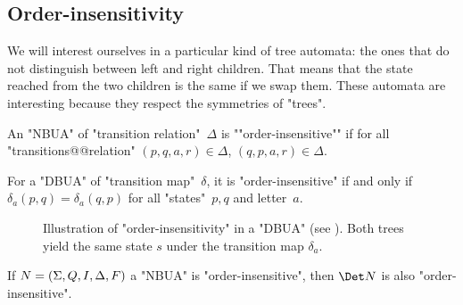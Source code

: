 \documentclass[a4paper,UKenglish,cleveref, autoref, thm-restate]{lipics-v2021}
\begin{document}
\subsection{Order-insensitivity}\label{sec:OrderAutomata}

We will interest ourselves in a particular kind of tree automata: the ones that do not distinguish between left and right children.
That means that the state reached from the two children is the same if we swap them. These automata are
interesting because they respect the symmetries of "trees".

\begin{definition}
    \AP An "NBUA" of "transition relation"~$\Delta$ is ""order-insensitive"" if for all "transitions@@relation" $(p,q,a,r) \in \Delta$,
	$(q,p,a,r) \in \Delta$.
\end{definition}

\begin{remark}\label{def:order-insensitive}
	For a "DBUA" of "transition map"~$\delta$, it is "order-insensitive" if and only if
	$\delta_a (p,q) = \delta_a (q,p)$ for all "states"~$p,q$ and letter~$a$.
\end{remark}


\begin{figure}[h]
	\centering
	\caption{Illustration of "order-insensitivity" in a "DBUA" (see ).
		Both trees yield the same state $s$ under the transition map $\delta_a$.}
	\label{fig:order-insensitivity}
\end{figure}



\begin{lemma}
	If $N = (\Sigma, Q, I, \Delta, F)$ a "NBUA" is "order-insensitive", then $\Det N$ is also "order-insensitive".
\end{lemma}
\end{document}
